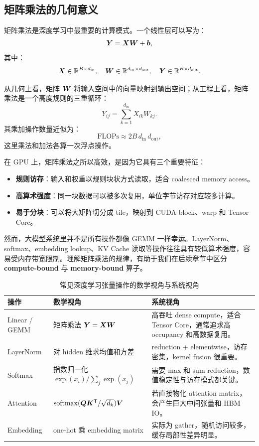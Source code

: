 \subsection{矩阵乘法的几何意义}
\label{subsec:matrix-multiplication-geometry}

矩阵乘法是深度学习中最重要的计算模式。一个线性层可以写为：
\[
  \bm{Y}=\bm{X}\bm{W}+\bm{b},
\]
其中：
\[
  \bm{X}\in\mathbb{R}^{B\times d_{\mathrm{in}}},
  \quad
  \bm{W}\in\mathbb{R}^{d_{\mathrm{in}}\times d_{\mathrm{out}}},
  \quad
  \bm{Y}\in\mathbb{R}^{B\times d_{\mathrm{out}}}.
\]

从几何上看，矩阵 $\bm{W}$ 将输入空间中的向量映射到输出空间；从工程上看，矩阵乘法是一个高度规则的三重循环：
\[
  Y_{ij}=\sum_{k=1}^{d_{\mathrm{in}}}X_{ik}W_{kj}.
\]
其乘加操作数量近似为：
\[
  \mathrm{FLOPs}\approx 2B\,d_{\mathrm{in}}\,d_{\mathrm{out}},
\]
这里乘法和加法各算一次浮点操作。

在 GPU 上，矩阵乘法之所以高效，是因为它具有三个重要特征：

\begin{itemize}
  \item \textbf{规则访存}：输入和权重以规则块状方式读取，适合 coalesced memory access。
  \item \textbf{高算术强度}：同一块数据可以被多次复用，单位字节访存对应较多计算。
  \item \textbf{易于分块}：可以将大矩阵切分成 tile，映射到 CUDA block、warp 和 Tensor Core。
\end{itemize}

然而，大模型系统里并不是所有操作都像 GEMM 一样幸运。LayerNorm、softmax、embedding lookup、KV Cache 读取等操作往往具有较低算术强度，容易受内存带宽限制。理解矩阵乘法的规律，有助于我们在后续章节中区分 \textbf{compute-bound} 与 \textbf{memory-bound} 算子。

\begin{table}[H]
  \centering
  \small
  \caption{常见深度学习张量操作的数学视角与系统视角}
  \label{tab:math-vs-system-view}
  \begin{tabular}{p{}p{}p{}}
    \toprule
    \textbf{操作} & \textbf{数学视角} & \textbf{系统视角} \\
    \midrule
    Linear / GEMM
    & 矩阵乘法 $\bm{Y}=\bm{X}\bm{W}$
    & 高吞吐 dense compute，适合 Tensor Core，通常追求高 occupancy 和高数据复用。 \\
    \midrule
    LayerNorm
    & 对 hidden 维求均值和方差
    & reduction + elementwise，访存密集，kernel fusion 很重要。 \\
    \midrule
    Softmax
    & 指数归一化 $\exp(x_i)/\sum_j\exp(x_j)$
    & 需要 max 和 sum reduction，数值稳定性与访存模式都关键。 \\
    \midrule
    Attention
    & $\operatorname{softmax}(\bm{Q}\bm{K}^{\mathsf{T}}/\sqrt{d_k})\bm{V}$
    & 若直接物化 attention matrix，会产生巨大中间张量和 HBM IO。 \\
    \midrule
    Embedding
    & one-hot 乘 embedding matrix
    & 实际为 gather，随机访问较多，缓存局部性差异明显。 \\
    \bottomrule
  \end{tabular}
\end{table}

